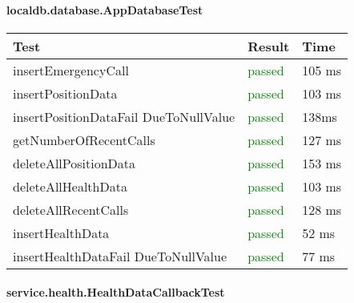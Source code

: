 \paragraph{localdb.database.AppDatabaseTest}

  \begin{adjustwidth}{1cm}{}
        \begin{longtable}{|p{}|p{}|p{}|}
            \hline
            \textbf{Test} & \textbf{Result} & \textbf{Time} \\
            \hline
            insertEmergencyCall & \textcolor{green}{passed} & 105 ms \\
            \hline
            insertPositionData &  \textcolor{green}{passed} & 103 ms\\
            \hline
            insertPositionDataFail DueToNullValue & \textcolor{green}{passed} & 138ms \\
            \hline
            getNumberOfRecentCalls & \textcolor{green}{passed} & 127 ms\\
            \hline
            deleteAllPositionData & \textcolor{green}{passed} &  153 ms\\
            \hline
            deleteAllHealthData &  \textcolor{green}{passed}  &  103 ms\\
            \hline
            deleteAllRecentCalls & \textcolor{green}{passed} & 128 ms\\
            \hline
            insertHealthData &  \textcolor{green}{passed} & 52 ms\\
            \hline
            insertHealthDataFail DueToNullValue & \textcolor{green}{passed} & 77 ms \\
            \hline
        
        \end{longtable}
    \end{adjustwidth}
    
\paragraph{service.health.HealthDataCallbackTest}

